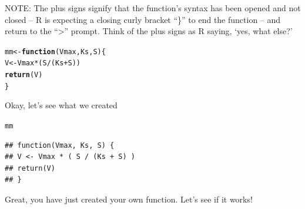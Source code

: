 \documentclass{tufte-handout}\usepackage[]{graphicx}\usepackage[]{color}
\makeatletter
\newcommand{\hlopt}[1]{\textcolor[rgb]{0,0,0}{#1}}%
\newcommand{\hlstd}[1]{\textcolor[rgb]{0.345,0.345,0.345}{#1}}%
\newcommand{\hlkwa}[1]{\textcolor[rgb]{0.161,0.373,0.58}{\textbf{#1}}}%
\newcommand{\hlkwb}[1]{\textcolor[rgb]{0.69,0.353,0.396}{#1}}%
\newcommand{\hlkwc}[1]{\textcolor[rgb]{0.333,0.667,0.333}{#1}}%
\newcommand{\hlkwd}[1]{\textcolor[rgb]{0.737,0.353,0.396}{\textbf{#1}}}%
\newenvironment{kframe}{%
 \def\at@end@of@kframe{}%
 \ifinner\ifhmode%
  \def\at@end@of@kframe{\end{minipage}}%
  \begin{minipage}{\columnwidth}%
 \fi\fi%
 \def\FrameCommand##1{\hskip\@totalleftmargin \hskip-\fboxsep
 \colorbox{shadecolor}{##1}\hskip-\fboxsep
     \hskip-\linewidth \hskip-\@totalleftmargin \hskip\columnwidth}%
 \MakeFramed {\advance\hsize-\width
   \@totalleftmargin\z@ \linewidth\hsize
   \@setminipage}}%
 {\par\unskip\endMakeFramed%
 \at@end@of@kframe}
\newenvironment{knitrout}{}{} %
\makeatother
\begin{document}
NOTE: The plus signs signify  that the function's syntax has been opened and not closed -- R is expecting a closing curly bracket ``\}'' to end the function -- and return to the ``>'' prompt. Think of the plus signs as R saying, `yes, what else?'

\begin{knitrout}
\color{fgcolor}\begin{kframe}
\begin{alltt}
\hlstd{mm} \hlkwb{<-} \hlkwa{function}\hlstd{(}\hlkwc{Vmax}\hlstd{,} \hlkwc{Ks}\hlstd{,} \hlkwc{S}\hlstd{) \{}
\hlstd{V} \hlkwb{<-} \hlstd{Vmax} \hlopt{*} \hlstd{( S} \hlopt{/} \hlstd{(Ks} \hlopt{+} \hlstd{S) )}
\hlkwd{return}\hlstd{(V)}
\hlstd{\}}
\end{alltt}
\end{kframe}
\end{knitrout}

Okay, let's see what we created

\begin{knitrout}
\color{fgcolor}\begin{kframe}
\begin{alltt}
\hlstd{mm}
\end{alltt}
\begin{verbatim}
## function(Vmax, Ks, S) {
## V <- Vmax * ( S / (Ks + S) )
## return(V)
## }
\end{verbatim}
\end{kframe}
\end{knitrout}

Great, you have just created your own function. Let's see if it works!
\end{document}
